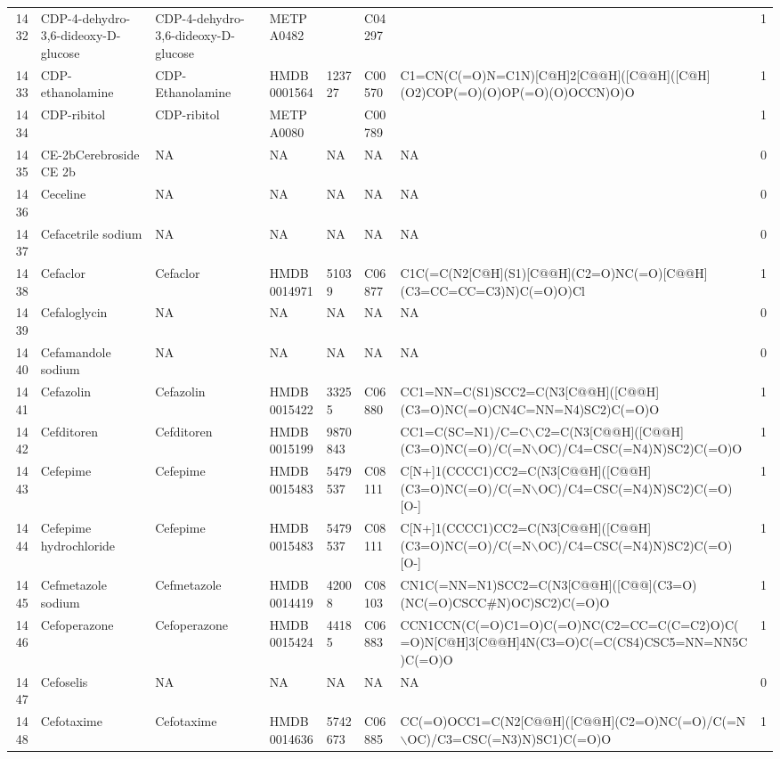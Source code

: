 \documentclass[a4paper]{article}
\begin{document}
\begin{longtable}{rlllllll}
  1432 & CDP-4-dehydro-3,6-dideoxy-D-glucose & CDP-4-dehydro-3,6-dideoxy-D-glucose & METPA0482 &  & C04297 &  & 1 \\ 
  1433 & CDP-ethanolamine & CDP-Ethanolamine & HMDB0001564 & 123727 & C00570 & C1=CN(C(=O)N=C1N)[C@H]2[C@@H]([C@@H]([C@H](O2)COP(=O)(O)OP(=O)(O)OCCN)O)O & 1 \\ 
  1434 & CDP-ribitol & CDP-ribitol & METPA0080 &  & C00789 &  & 1 \\ 
  1435 & CE-2bCerebroside CE 2b & NA & NA & NA & NA & NA & 0 \\ 
  1436 & Ceceline & NA & NA & NA & NA & NA & 0 \\ 
  1437 & Cefacetrile sodium & NA & NA & NA & NA & NA & 0 \\ 
  1438 & Cefaclor & Cefaclor & HMDB0014971 & 51039 & C06877 & C1C(=C(N2[C@H](S1)[C@@H](C2=O)NC(=O)[C@@H](C3=CC=CC=C3)N)C(=O)O)Cl & 1 \\ 
  1439 & Cefaloglycin & NA & NA & NA & NA & NA & 0 \\ 
  1440 & Cefamandole sodium & NA & NA & NA & NA & NA & 0 \\ 
  1441 & Cefazolin & Cefazolin & HMDB0015422 & 33255 & C06880 & CC1=NN=C(S1)SCC2=C(N3[C@@H]([C@@H](C3=O)NC(=O)CN4C=NN=N4)SC2)C(=O)O & 1 \\ 
  1442 & Cefditoren & Cefditoren & HMDB0015199 & 9870843 &  & CC1=C(SC=N1)/C=C$\backslash$C2=C(N3[C@@H]([C@@H](C3=O)NC(=O)/C(=N$\backslash$OC)/C4=CSC(=N4)N)SC2)C(=O)O & 1 \\ 
  1443 & Cefepime & Cefepime & HMDB0015483 & 5479537 & C08111 & C[N+]1(CCCC1)CC2=C(N3[C@@H]([C@@H](C3=O)NC(=O)/C(=N$\backslash$OC)/C4=CSC(=N4)N)SC2)C(=O)[O-] & 1 \\ 
  1444 & Cefepime hydrochloride & Cefepime & HMDB0015483 & 5479537 & C08111 & C[N+]1(CCCC1)CC2=C(N3[C@@H]([C@@H](C3=O)NC(=O)/C(=N$\backslash$OC)/C4=CSC(=N4)N)SC2)C(=O)[O-] & 1 \\ 
  1445 & Cefmetazole sodium & Cefmetazole & HMDB0014419 & 42008 & C08103 & CN1C(=NN=N1)SCC2=C(N3[C@@H]([C@@](C3=O)(NC(=O)CSCC\#N)OC)SC2)C(=O)O & 1 \\ 
  1446 & Cefoperazone & Cefoperazone & HMDB0015424 & 44185 & C06883 & CCN1CCN(C(=O)C1=O)C(=O)NC(C2=CC=C(C=C2)O)C(=O)N[C@H]3[C@@H]4N(C3=O)C(=C(CS4)CSC5=NN=NN5C)C(=O)O & 1 \\ 
  1447 & Cefoselis & NA & NA & NA & NA & NA & 0 \\ 
  1448 & Cefotaxime & Cefotaxime & HMDB0014636 & 5742673 & C06885 & CC(=O)OCC1=C(N2[C@@H]([C@@H](C2=O)NC(=O)/C(=N$\backslash$OC)/C3=CSC(=N3)N)SC1)C(=O)O & 1 \\ 

\end{longtable}
\end{document}
